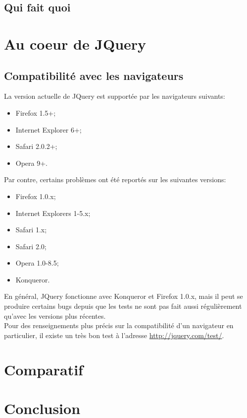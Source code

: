 \documentclass[10pt,a4paper,titlepage]{article}
\begin{document}
\subsection{Qui fait quoi}



\newpage
\renewcommand{\labelitemi}{$\bullet$}
\section{Au coeur de JQuery}

\subsection{Compatibilité avec les navigateurs}
La version actuelle de JQuery est supportée par les navigateurs suivants:

\begin{itemize}
	\item {Firefox 1.5+;}
	\item {Internet Explorer 6+;}
	\item {Safari 2.0.2+;}
	\item {Opera 9+.\\}
\end{itemize}

Par contre, certains problèmes ont été reportés sur les suivantes versions:
\begin{itemize}
	\item {Firefox 1.0.x;}
	\item {Internet Explorers 1-5.x;}
	\item {Safari 1.x;}
	\item {Safari 2.0;}
	\item {Opera 1.0-8.5;}
	\item {Konqueror.\\}
\end{itemize}

En général, JQuery fonctionne avec Konqueror et Firefox 1.0.x, mais il peut se produire certains bugs depuis que les tests ne sont pas fait aussi régulièrement qu'avec les versions plus récentes.\\

Pour des renseignements plus précis sur la compatibilité d'un navigateur en particulier, il existe un très bon test à l'adresse \url{http://jquery.com/test/}.

\newpage
\section{Comparatif}

\newpage
\section{Conclusion}

% 
% 
% 
% 
\end{document}
